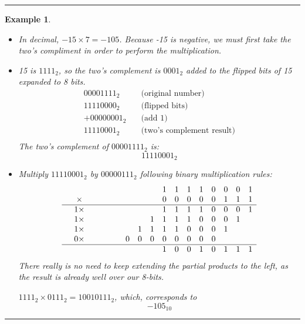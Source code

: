 \documentclass[12pt]{article}
\newtheorem{example}{Example}
\newenvironment{examp}
{\vspace{0.5cm}
 \hrule
\vspace{0.5cm}
\begin{example}}
{\hrule
\vspace{0.5cm}
\end{example}}
\begin{document}
\begin{examp}
	\begin{itemize}
		\item In decimal, \(-15 \times 7 = -105\).
		      Because -15 is negative, we must first take the two's compliment in order to perform the multiplication.
		\item 15 is \(1111_2\), so the two's complement is \(0001_2\) added to the flipped bits of 15 expanded to 8 bits.
		      \[
			      \begin{aligned}
				      00001111_2   & \quad \text{(original number)}         \\
				      \hline
				      11110000_2   & \quad \text{(flipped bits)}            \\
				      + 00000001_2 & \quad \text{(add 1)}                   \\
				      \hline
				      11110001_2   & \quad \text{(two's complement result)} \\
			      \end{aligned}
		      \]
		      The two's complement of \(00001111_2\) is:
		      \[
			      11110001_2
		      \]
		\item Multiply \(11110001_2\) by \(00000111_2\) following binary multiplication rules:
		      \[
			      \begin{array}{c c c c c c c c c c c c c c c c c }
				       &          &  &  &  &  &   &   &   & 1 & 1 & 1 & 1 & 0 & 0 & 0 & 1 \\
				       & \times   &  &  &  &  &   &   &   & 0 & 0 & 0 & 0 & 0 & 1 & 1 & 1 \\
				      \hline

				       & 1 \times &  &  &  &  &   &   &   & 1 & 1 & 1 & 1 & 0 & 0 & 0 & 1 \\

				       & 1 \times &  &  &  &  &   &   & 1 & 1 & 1 & 1 & 0 & 0 & 0 & 1 &   \\
				       & 1 \times &  &  &  &  &   & 1 & 1 & 1 & 1 & 0 & 0 & 0 & 1 &   &   \\
				       & 0 \times &  &  &  &  & 0 & 0 & 0 & 0 & 0 & 0 & 0 & 0 &   &   &   \\
				      \hline
				       &          &  &  &  &  &   &   &   & 1 & 0 & 0 & 1 & 0 & 1 & 1 & 1 \\
			      \end{array}
		      \]
		      There really is no need to keep extending the partial products to the left, as the result is already well over our 8-bits.

		      \(1111_2 \times 0111_2 = 10010111_2\), which, corresponds to
		      \[
			      -105_{10}
		      \]
	\end{itemize}
\end{examp}
\end{document}
